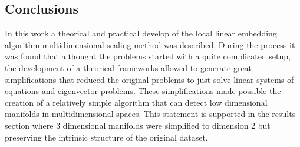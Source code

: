 \documentclass[a0,portrait]{a0poster}
\begin{document}
\begin{multicols}{3}
    \section*{Conclusions}

    In this work a theorical and practical develop of the local linear embedding
    algorithm multidimensional scaling method was described. During the process
    it was found that althought the problems started with a quite complicated
    setup, the development of a theorical frameworks  allowed to generate great
    simplifications that reduced the original problems to just solve linear
    systems of equations and eigenvector problems. These simplifications made
    possible the creation of a relatively simple algorithm that can detect low
    dimensional manifolds in multidimensional spaces. This statement is
    supported in the results section where 3 dimensional manifolds were
    simplified to dimension 2 but preserving the intrinsic structure of the
    original dataset.

    
    

\end{multicols}
\end{document}
